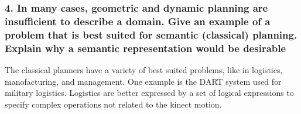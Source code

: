 \documentclass[10pt, letter]{article}
\begin{document}
\subsubsection*{4. In many cases, geometric and dynamic planning are insufficient to describe a domain. Give
an example of a problem that is best suited for semantic (classical) planning. Explain why a
semantic representation would be desirable}

The classical planners have a variety of best suited problems, like in logistics, manofacturing, and management. One example is the DART system used for military logistics. Logistics are better expressed by a set of logical expressions to specify complex operations not related to the kinect motion.

\end{document}
